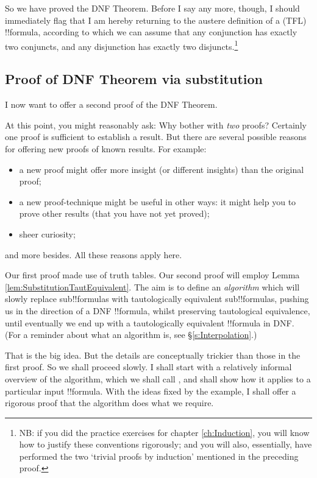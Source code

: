 \documentclass[../../../include/open-logic-section]{subfiles}
\begin{document}
So we have proved the DNF Theorem. Before I say any more, though, I should immediately flag that I am hereby returning to the austere definition of a (TFL) !!{formula}, according to which we can assume that any conjunction has exactly two conjuncts, and any disjunction has exactly two disjuncts.\footnote{NB: if you did the practice exercises for chapter \ref{ch:Induction}, you will know how to justify these conventions rigorously; and you will also, essentially, have performed the two `trivial proofs by induction' mentioned in the preceding proof.}  


\subsection{Proof of DNF Theorem via substitution}\label{s:DNFsubstitution}
I now want to offer a second proof of the DNF Theorem. 

At this point, you might reasonably ask: Why bother with \emph{two} proofs? Certainly one proof is sufficient to establish a result. But there are several possible reasons for offering new proofs of known results. For example:
	\begin{itemize}
		\item a new proof might offer more insight (or different insights) than the original proof;
		\item a new proof-technique might be useful in other ways: it might help you to prove other results (that you have not yet proved);
		\item sheer curiosity;
	\end{itemize}
and more besides. All these reasons apply here. 

Our first proof made use of truth tables. Our second proof will employ Lemma \ref{lem:SubstitutionTautEquivalent}. The aim is to define an \emph{algorithm} which will slowly replace sub!!{formula}s with tautologically equivalent sub!!{formula}s, pushing us in the direction of a DNF !!{formula}, whilst preserving tautological equivalence, until eventually we end up with a tautologically equivalent !!{formula} in DNF. (For a reminder about what an algorithm is, see \S\ref{s:Interpolation}.) 

That is the big idea. But the details are conceptually trickier than those in the first proof. So we shall proceed slowly. I shall start with a relatively informal overview of the algorithm, which we shall call \intoDNF{}, and shall show how it applies to a particular input !!{formula}. With the ideas fixed by the example, I shall offer a rigorous proof that the algorithm does what we require.
\end{document}
